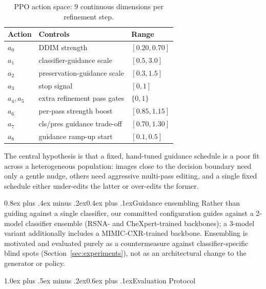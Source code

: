 \documentclass[10pt,twocolumn]{article}
\makeatletter
\renewcommand\section{\@startsection{section}{1}{\z@}%
  {1.0ex plus .5ex minus .2ex}{0.6ex plus .1ex}{\normalfont\large\bfseries}}
\renewcommand\subsection{\@startsection{subsection}{2}{\z@}%
  {0.8ex plus .4ex minus .2ex}{0.4ex plus .1ex}{\normalfont\normalsize\bfseries}}
\makeatother
\begin{document}
\begin{table}[t]
\centering
\small
\caption{PPO action space: 9 continuous dimensions per refinement step.}
\label{tab:actionspace}
\begin{tabular}{@{}lll@{}}
\toprule
\textbf{Action} & \textbf{Controls} & \textbf{Range} \\
\midrule
$a_0$ & DDIM strength & $[0.20,0.70]$ \\
$a_1$ & classifier-guidance scale & $[0.5,3.0]$ \\
$a_2$ & preservation-guidance scale & $[0.3,1.5]$ \\
$a_3$ & stop signal & $[0,1]$ \\
$a_4,a_5$ & extra refinement pass gates & $\{0,1\}$ \\
$a_6$ & per-pass strength boost & $[0.85,1.15]$ \\
$a_7$ & cls/pres guidance trade-off & $[0.70,1.30]$ \\
$a_8$ & guidance ramp-up start & $[0.1,0.5]$ \\
\bottomrule
\end{tabular}
\end{table}

The central hypothesis is that a fixed, hand-tuned guidance schedule is a
poor fit across a heterogeneous population: images close to the decision
boundary need only a gentle nudge, others need aggressive multi-pass
editing, and a single fixed schedule either under-edits the latter or
over-edits the former.

\subsection{Guidance ensembling}
Rather than guiding against a single classifier, our committed
configuration guides against a 2-model classifier ensemble (RSNA- and
CheXpert-trained backbones); a 3-model variant additionally includes a
MIMIC-CXR-trained backbone. Ensembling is motivated and evaluated purely
as a countermeasure against classifier-specific blind spots
(Section~\ref{sec:experiments}), not as an architectural change to the
generator or policy.

\section{Evaluation Protocol}
\label{sec:evalprotocol}
\end{document}
